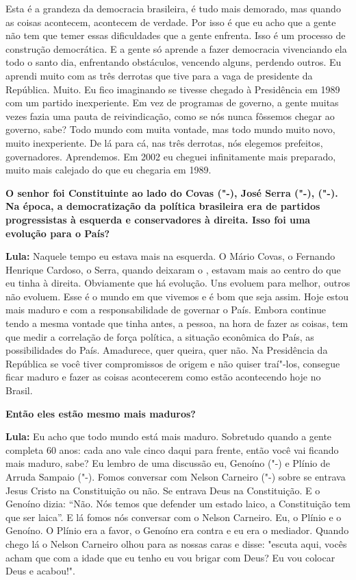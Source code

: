 Esta é a grandeza da democracia brasileira, é tudo mais demorado, mas
quando as coisas acontecem, acontecem de verdade. Por isso é que eu acho
que a gente não tem que temer essas dificuldades que a gente enfrenta.
Isso é um processo de construção democrática. E a gente só aprende a
fazer democracia vivenciando ela todo o santo dia, enfrentando
obstáculos, vencendo alguns, perdendo outros. Eu aprendi muito com as
três derrotas que tive para a vaga de presidente da República. Muito. Eu
fico imaginando se tivesse chegado à Presidência em 1989 com um partido
inexperiente. Em vez de programas de governo, a gente muitas vezes fazia
uma pauta de reivindicação, como se nós nunca fôssemos chegar ao
governo, sabe? Todo mundo com muita vontade, mas todo mundo muito novo,
muito inexperiente. De lá para cá, nas três derrotas, nós elegemos
prefeitos, governadores. Aprendemos. Em 2002 eu cheguei infinitamente
mais preparado, muito mais calejado do que eu chegaria em 1989.

\textbf{O senhor foi Constituinte ao lado do Covas ("-), José Serra
("-),  ("-). Na época, a democratização da política
brasileira era de partidos progressistas à esquerda e conservadores à
direita. Isso foi uma evolução para o País?}

\textbf{Lula:} Naquele tempo eu estava mais na esquerda. O Mário Covas,
o Fernando Henrique Cardoso, o Serra, quando deixaram o , estavam
mais ao centro do que eu tinha à direita. Obviamente que há evolução.
Uns evoluem para melhor, outros não evoluem. Esse é o mundo em que
vivemos e é bom que seja assim. Hoje estou mais maduro e com a
responsabilidade de governar o País. Embora continue tendo a mesma
vontade que tinha antes, a pessoa, na hora de fazer as coisas, tem que
medir a correlação de força política, a situação econômica do País, as
possibilidades do País. Amadurece, quer queira, quer não. Na Presidência
da República se você tiver compromissos de origem e não quiser traí"-los,
consegue ficar maduro e fazer as coisas acontecerem como estão
acontecendo hoje no Brasil.

\textbf{Então eles estão mesmo mais maduros?}

\textbf{Lula:} Eu acho que todo mundo está mais maduro. Sobretudo quando
a gente completa 60 anos: cada ano vale cinco daqui para frente, então
você vai ficando mais maduro, sabe? Eu lembro de uma discussão eu,
Genoíno ("-) e Plínio de Arruda Sampaio ("-). Fomos conversar com
Nelson Carneiro ("-) sobre se entrava Jesus Cristo na Constituição
ou não. Se entrava Deus na Constituição. E o Genoíno dizia: ``Não. Nós
temos que defender um estado laico, a Constituição tem que ser laica''.
E lá fomos nós conversar com o Nelson Carneiro. Eu, o Plínio e o
Genoíno. O Plínio era a favor, o Genoíno era contra e eu era o mediador.
Quando chego lá o Nelson Carneiro olhou para as nossas caras e disse:
"escuta aqui, vocês acham que com a idade que eu tenho eu vou brigar com
Deus? Eu vou colocar Deus e acabou!".

